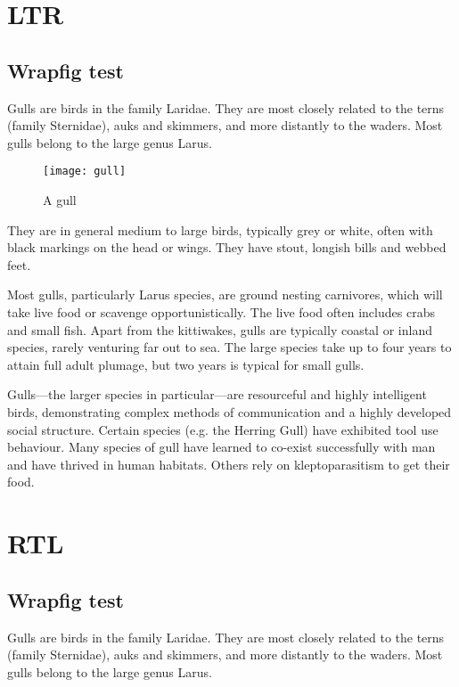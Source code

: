 \documentclass[a4paper,12pt]{article}
\begin{document}
\section{LTR}
\subsection*{Wrapfig test}


Gulls are birds in the family Laridae. They are most closely
 related to the terns (family Sternidae), auks and skimmers,
and more distantly to the waders. Most gulls belong to the
large genus Larus.

\begin{wrapfigure}{r}{0.5\textwidth}
  \begin{center}
    \texttt{[image: gull]}
  \end{center}
  \caption{A gull}
\end{wrapfigure}

They are in general medium to large birds, typically grey or white,
often with black markings on the head or wings. They have stout,
longish bills and webbed feet.

Most gulls, particularly Larus species, are ground nesting carnivores,
which will take live food or scavenge opportunistically. The live food
often includes crabs and small fish. Apart from the kittiwakes, gulls
are typically coastal or inland species, rarely venturing far out to sea.
The large species take up to four years to attain full adult plumage,
but two years is typical for small gulls.

Gulls---the larger species in particular---are resourceful and
highly intelligent birds, demonstrating complex methods of communication
and a highly developed social structure. Certain species (e.g. the
Herring Gull) have exhibited tool use behaviour. Many species of gull have
learned to co-exist successfully with man and have thrived in human habitats.
Others rely on kleptoparasitism to get their food.

\newpage
\section{RTL}

\setRTL
\subsection*{Wrapfig test}


Gulls are birds in the family Laridae. They are most closely
 related to the terns (family Sternidae), auks and skimmers,
and more distantly to the waders. Most gulls belong to the
large genus Larus.
\end{document}
